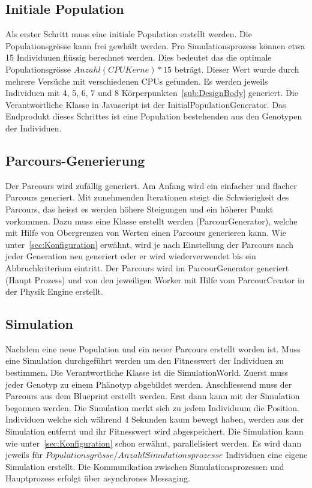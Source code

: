     \subsection{Initiale Population\label{sec:Initiale Polulation}}

      Als erster Schritt muss eine initiale Population erstellt werden. Die Populationsgrösse kann frei gewhält werden.
      Pro Simulationsprozess können etwa 15 Individuuen flüssig berechnet werden.
      Dies bedeutet das die optimale Populationsgrösse  \( Anzahl(CPU Kerne) * 15 \) beträgt.
      Dieser Wert wurde durch mehrere Versüche mit verschiedenen CPUs gefunden.
      Es werden jeweils Individuen mit 4, 5, 6, 7 und 8 Körperpunkten~\ref{sub:DesignBody} generiert.
      Die Verantwortliche Klasse in Javascript ist der InitialPopulationGenerator.
      Das Endprodukt dieses Schrittes ist eine Population bestehenden aus den Genotypen der Individuen.

    \subsection{Parcours-Generierung\label{sec:Parcour Generierung}}

      Der Parcours wird zufällig generiert. Am Anfang wird ein einfacher und flacher Parcours generiert.
      Mit zunehmenden Iterationen steigt die Schwierigkeit des Parcours,
      das heisst es werden höhere Steigungen und ein höherer Punkt vorkommen.
      Dazu muss eine Klasse erstellt werden (ParcourGenerator),
      welche mit Hilfe von Obergrenzen von Werten einen Parcours generieren kann.
      Wie unter~\ref{sec:Konfiguration} erwähnt,
      wird je nach Einstellung der Parcours nach jeder Generation neu generiert oder er wird wiederverwendet
      bis ein Abbruchkriterium eintritt.
      Der Parcours wird im ParcourGenerator generiert (Haupt Prozess) und
      von den jeweiligen Worker mit Hilfe vom ParcourCreator in der Physik Engine erstellt.

    \subsection{Simulation\label{sec:simulation}}

      Nachdem eine neue Population und ein neuer Parcours erstellt worden ist.
      Muss eine Simulation durchgeführt werden um den Fitnesswert der Individuen zu bestimmen.
      Die Verantwortliche Klasse ist die SimulationWorld.
      Zuerst muss jeder Genotyp zu einem Phänotyp abgebildet werden.
      Anschliessend muss der Parcours aus dem Blueprint erstellt werden.
      Erst dann kann mit der Simulation begonnen werden.
      Die Simulation merkt sich zu jedem Individuum die Position.
      Individuen welche sich während 4 Sekunden kaum bewegt haben,
      werden aus der Simulation entfernt und ihr Fitnesswert wird abgespeichert.
      Die Simulation kann wie unter~\ref{sec:Konfiguration} schon erwähnt, parallelisiert werden.
      Es wird dann jeweils für \( Populationsgrösse / Anzahl Simulationsprozesse \) Individuen eine eigene Simulation erstellt.
      Die Kommunikation zwischen Simulationsprozessen und Hauptprozess erfolgt über asynchrones Messaging.

